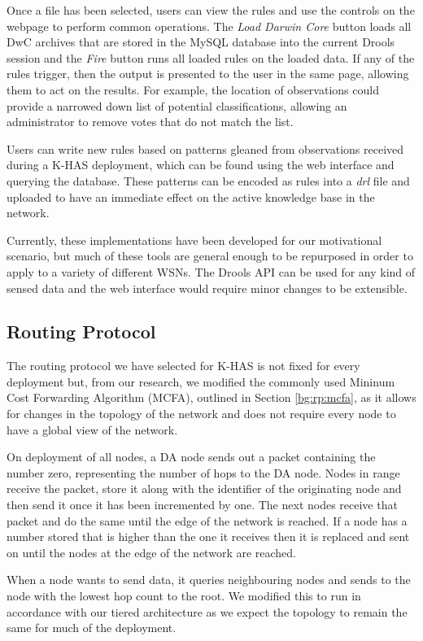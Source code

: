 	Once a file has been selected, users can view the rules and use the controls on the webpage to perform common operations. The \textit{Load Darwin Core} button loads all DwC archives that are stored in the MySQL database into the current Drools session and the \textit{Fire} button runs all loaded rules on the loaded data. If any of the rules trigger, then the output is presented to the user in the same page, allowing them to act on the results. For example, the location of observations could provide a narrowed down list of potential classifications, allowing an administrator to remove votes that do not match the list.

	Users can write new rules based on patterns gleaned from observations received during a K-HAS deployment, which can be found using the web interface and querying the database. These patterns can be encoded as rules into a \textit{drl} file and uploaded to have an immediate effect on the active knowledge base in the network. 
	
	Currently, these implementations have been developed for our motivational scenario, but much of these tools are general enough to be repurposed in order to apply to a variety of different WSNs. The Drools API can be used for any kind of sensed data and the web interface would require minor changes to be extensible.

	\subsection{Routing Protocol}\label{arch:routing}
		The routing protocol we have selected for K-HAS is not fixed for every deployment but, from our research, we modified the commonly used Mininum Cost Forwarding Algorithm (MCFA), outlined in Section \ref{bg:rp:mcfa}, as it allows for changes in the topology of the network and does not require every node to have a global view of the network.

		On deployment of all nodes, a DA node sends out a packet containing the number zero, representing the number of hops to the DA node. Nodes in range receive the packet, store it along with the identifier of the originating node and then send it once it has been incremented by one. The next nodes receive that packet and do the same until the edge of the network is reached. If a node has a number stored that is higher than the one it receives then it is replaced and sent on until the nodes at the edge of the network are reached.

		When a node wants to send data, it queries neighbouring nodes and sends to the node with the lowest hop count to the root. We modified this to run in accordance with our tiered architecture as we expect the topology to remain the same for much of the deployment.

